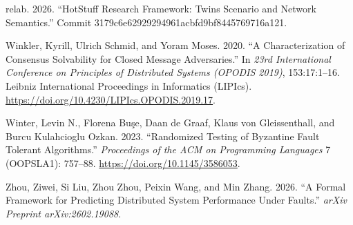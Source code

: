 \documentclass[10pt,a4paper]{article}
\newlength{\cslhangindent}
\newenvironment{CSLReferences}[2]
 {\begin{list}{}{%
  \setlength{\itemindent}{0pt}
  \setlength{\leftmargin}{0pt}
  \setlength{\parsep}{0pt}
  \ifodd #1
   \setlength{\leftmargin}{\cslhangindent}
   \setlength{\itemindent}{-1\cslhangindent}
  \fi
  \setlength{\itemsep}{#2\baselineskip}}}
 {\end{list}}
\begin{document}
\begin{CSLReferences}{1}{0}
relab. 2026. {``HotStuff Research Framework: Twins Scenario and Network
Semantics.''} Commit 3179c6e62929294961acbfd9bf8445769716a121.

Winkler, Kyrill, Ulrich Schmid, and Yoram Moses. 2020. {``A
Characterization of Consensus Solvability for Closed Message
Adversaries.''} In \emph{23rd International Conference on Principles of
Distributed Systems (OPODIS 2019)}, 153:17:1--16. Leibniz International
Proceedings in Informatics (LIPIcs).
\url{https://doi.org/10.4230/LIPIcs.OPODIS.2019.17}.

Winter, Levin N., Florena Buşe, Daan de Graaf, Klaus von Gleissenthall,
and Burcu Kulahcioglu Ozkan. 2023. {``Randomized Testing of Byzantine
Fault Tolerant Algorithms.''} \emph{Proceedings of the ACM on
Programming Languages} 7 (OOPSLA1): 757--88.
\url{https://doi.org/10.1145/3586053}.

Zhou, Ziwei, Si Liu, Zhou Zhou, Peixin Wang, and Min Zhang. 2026. {``A
Formal Framework for Predicting Distributed System Performance Under
Faults.''} \emph{arXiv Preprint arXiv:2602.19088}.

\end{CSLReferences}
\end{document}
